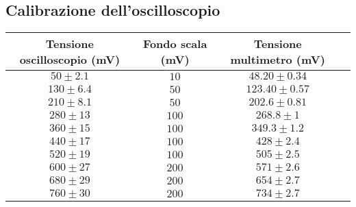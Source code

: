 \documentclass[]{article}
\begin{document}
\subsection{Calibrazione dell'oscilloscopio}
\begin{center}
	\begin{tabular}{|c|c|c|c|}
		\hline
		Tensione oscilloscopio (mV)& Fondo scala (mV) & Tensione multimetro (mV) \\
		\hline
		$ 50\pm 2.1 $ &$ 10 $ & $ 48.20\pm 0.34 $ \\
		\hline
		$ 130\pm 6.4$ &$ 50 $ & $ 123.40\pm 0.57 $ \\
		\hline
		$ 210\pm 8.1 $ &$ 50 $ & $ 202.6\pm 0.81 $ \\
		\hline
		$ 280\pm 13$ &$ 100 $ & $ 268.8\pm 1 $ \\
		\hline
		$ 360\pm 15 $ &$ 100 $ & $ 349.3\pm 1.2 $ \\
		\hline
		$ 440\pm 17 $ &$ 100 $ & $ 428\pm 2.4 $ \\
		\hline
		$ 520\pm 19 $ &$ 100 $ & $ 505\pm 2.5 $ \\
		\hline
		$ 600\pm 27 $ &$ 200 $ & $ 571\pm 2.6 $ \\
		\hline
		$ 680\pm 29 $ &$ 200 $ & $ 654\pm 2.7 $ \\
		\hline
		$ 760\pm 30 $ &$ 200 $ & $ 734\pm 2.7 $ \\
		\hline
	\end{tabular}
\end{center}
\end{document}
